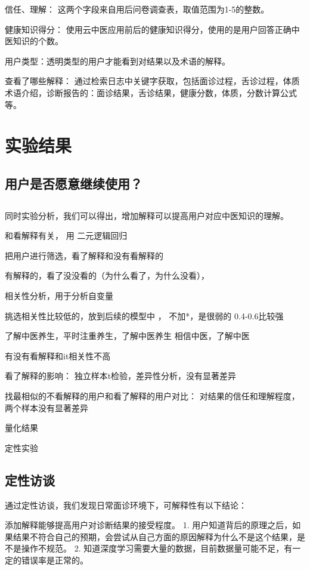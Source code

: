 信任、理解： 这两个字段来自用后问卷调查表，取值范围为1-5的整数。

健康知识得分： 使用云中医应用前后的健康知识得分，使用的是用户回答正确中医知识的个数。

用户类型：透明类型的用户才能看到对结果以及术语的解释。

查看了哪些解释： 通过检索日志中关键字获取，包括面诊过程，舌诊过程，体质术语介绍，诊断报告的：面诊结果，舌诊结果，健康分数，体质，分数计算公式等。

\section{实验结果}

\subsection{用户是否愿意继续使用？}

\subsection{}

同时实验分析，我们可以得出，增加解释可以提高用户对应中医知识的理解。

和看解释有关， 用 二元逻辑回归

把用户进行筛选，看了解释和没有看解释的

有解释的，看了没没看的（为什么看了，为什么没看）， 

相关性分析，用于分析自变量

挑选相关性比较低的，放到后续的模型中 ， 不加*，是很弱的 0.4-0.6比较强

了解中医养生，平时注重养生，了解中医养生
相信中医，了解中医

有没有看解释和it相关性不高

看了解释的影响：
独立样本t检验，差异性分析，没有显著差异

找最相似的不看解释的用户和看了解释的用户对比： 
对结果的信任和理解程度，两个样本没有显著差异



量化结果

定性实验

\subsection{定性访谈}

通过定性访谈，我们发现日常面诊环境下，可解释性有以下结论：

添加解释能够提高用户对诊断结果的接受程度。
1. 用户知道背后的原理之后，如果结果不符合自己的预期，会尝试从自己方面的原因解释为什么不是这个结果，是不是操作不规范。
2. 知道深度学习需要大量的数据，目前数据量可能不足，有一定的错误率是正常的。

